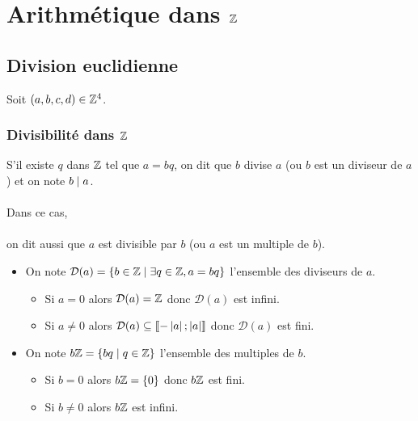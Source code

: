 \chapter{Arithmétique dans \(\mathbb{Z}\)}

\minitoc

\section{Division euclidienne}
Soit \((a, b, c, d) \in \mathbb{Z}^4\).
\subsection{Divisibilité dans \(\mathbb{Z}\)}
\begin{defi}
	S’il existe \(q\) dans \(\mathbb{Z}\) tel que \(a = bq\), on dit que \(b\) divise \(a\) (ou \(b\) est un diviseur de \(a\)) et on note \(b \mid a\).\\~\\
	Dans ce cas,\\~\\
	on dit aussi que \(a\) est divisible par \(b\) (ou \(a\) est un multiple de \(b\)).
\end{defi}

\begin{defprop}
	\begin{itemize}
		\item On note \(\mathcal{D}(a) = \left\lbrace b \in \mathbb{Z} \;\middle|\; \exists q \in \mathbb{Z}, a = bq\right\rbrace\) l’ensemble des diviseurs de \(a\).
		      \begin{itemize}
			      \item Si \(a = 0\) alors \(\mathcal{D}(a) = \mathbb{Z}\) donc \(\mathcal{D}(a)\) est infini.
			      \item Si \(a \neq 0\) alors \(\mathcal{D}(a) \subseteq \left\llbracket-\left\lvert a\right\rvert;\left\lvert a\right\rvert\right\rrbracket \) donc \(\mathcal{D}(a)\) est fini.
		      \end{itemize}
		\item On note \(b\mathbb{Z} = \left\lbrace bq \;\middle|\; q \in \mathbb{Z}\right\rbrace\) l’ensemble des multiples de \(b\).
		      \begin{itemize}
			      \item Si \(b = 0\) alors \(b\mathbb{Z} = \left\lbrace0\right\rbrace\) donc \(b\mathbb{Z}\) est fini.
			      \item Si \(b \neq 0\) alors \(b\mathbb{Z}\) est infini.
		      \end{itemize}
	\end{itemize}
\end{defprop}

